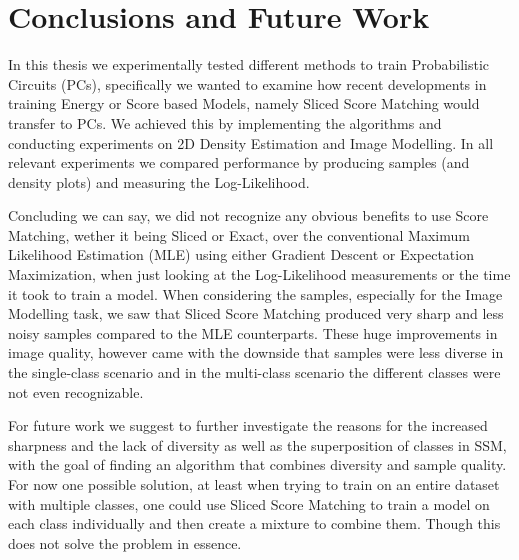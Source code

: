 \chapter{Conclusions and Future Work}
\label{cha:conclusions}

In this thesis we experimentally tested different methods to train Probabilistic Circuits (PCs), specifically
we wanted to examine how recent developments in training Energy or Score based Models, namely 
Sliced Score Matching would transfer to PCs. 
We achieved this by implementing the algorithms and conducting experiments on 2D Density Estimation
and Image Modelling. In all relevant experiments we compared performance by producing samples 
(and density plots) and measuring the Log-Likelihood.

Concluding we can say, we did not recognize any obvious benefits to use Score Matching, wether it being Sliced 
or Exact, over the conventional Maximum Likelihood Estimation (MLE) using either Gradient Descent 
or Expectation Maximization, when just looking at the Log-Likelihood measurements or the time it 
took to train a model. 
When considering the samples, especially for the Image Modelling task, we saw that Sliced Score Matching
produced very sharp and less noisy samples compared to the MLE counterparts.
These huge improvements in image quality, however came with the downside that 
samples were less diverse in the single-class scenario and in the multi-class scenario
the different classes were not even recognizable.

For future work we suggest to further investigate the reasons for the increased sharpness and the 
lack of diversity as well as the superposition of classes in SSM, with the goal of finding 
an algorithm that combines diversity and sample quality. 
For now one possible solution, at least when trying to train on an entire dataset with 
multiple classes, one could use Sliced Score Matching to train a model on each class individually and 
then create a mixture to combine them. Though this does not solve the problem in essence.
